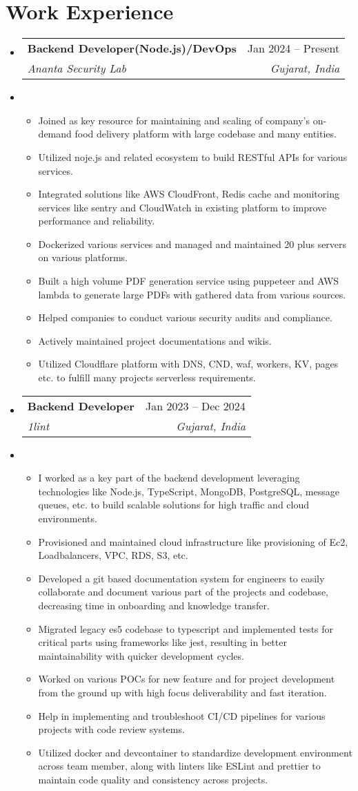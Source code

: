 \documentclass[letterpaper,12pt]{article}
\makeatletter
\newcommand{\resumeItem}[1]{
  \item\small{
    {#1 \vspace{-2pt}}
  }
}
\newcommand{\resumeSubheading}[4]{
  \vspace{-2pt}\item
    \begin{tabular*}{0.97\textwidth}[t]{l@{\extracolsep{\fill}}r}
      \textbf{#1} & #2 \\
      \textit{\small#3} & \textit{\small #4} \\
    \end{tabular*}\vspace{-7pt}
}
\newcommand{\resumeSubHeadingListStart}{\begin{itemize}[leftmargin=0.15in, label={}]}
\newcommand{\resumeSubHeadingListEnd}{\end{itemize}}
\newcommand{\resumeItemListStart}{\begin{itemize}}
\newcommand{\resumeItemListEnd}{\end{itemize}\vspace{-5pt}}
\makeatother
\begin{document}
\section{Work Experience}
\resumeSubHeadingListStart
\resumeSubheading
{Backend Developer(Node.js)/DevOps}{Jan 2024 -- Present}
{Ananta Security Lab}{Gujarat, India}
\resumeItem{
  \resumeItemListStart
  \resumeItem{Joined as key resource for maintaining and scaling of company's on-demand food delivery platform with large codebase and many entities.}
  \resumeItem{Utilized noje.js and related ecosystem to build RESTful APIs for various services.}
  \resumeItem{Integrated solutions like AWS CloudFront, Redis cache and monitoring services like sentry and CloudWatch in existing platform to improve performance and reliability.}
  \resumeItem{Dockerized various services and managed and maintained 20 plus servers on various platforms.}
  \resumeItem{Built a high volume PDF generation service using puppeteer and AWS lambda to generate large PDFs with gathered data from various sources.}
  \resumeItem{Helped companies to conduct various security audits and compliance.}
  \resumeItem{Actively maintained project documentations and wikis.}
  \resumeItem{Utilized Cloudflare platform with DNS, CND, waf, workers, KV, pages etc. to fulfill many projects serverless requirements.}
  \resumeItemListEnd
}
\resumeSubHeadingListEnd
\resumeSubHeadingListStart
\resumeSubheading
{Backend Developer}{Jan 2023 -- Dec 2024}
{1lint}{Gujarat, India}
\resumeItem{
  \resumeItemListStart
  \resumeItem{I worked as a key part of the backend development leveraging technologies like Node.js, TypeScript, MongoDB, PostgreSQL, message queues, etc. to build scalable solutions for high traffic and cloud environments.}
  \resumeItem{Provisioned and maintained cloud infrastructure like provisioning of Ec2, Loadbalancers, VPC, RDS, S3, etc.}
  \resumeItem{Developed a git based documentation system for engineers to easily collaborate and document various part of the projects and codebase, decreasing time in onboarding and knowledge transfer.}
  \resumeItem{Migrated legacy es5 codebase to typescript and implemented tests for critical parts using frameworks like jest, resulting in better maintainability with quicker development cycles.}
  \resumeItem{Worked on various POCs for new feature and for project development from the ground up with high focus deliverability and fast iteration.}
  \resumeItem{Help in implementing and troubleshoot CI/CD pipelines for various projects with code review systems.}
  \resumeItem{Utilized docker and devcontainer to standardize development environment across team member, along with linters like ESLint and prettier to maintain code quality and consistency across projects.}
  \resumeItemListEnd
}
\resumeSubHeadingListEnd
\end{document}
